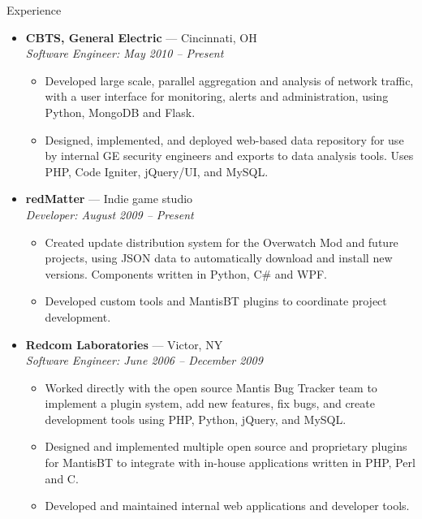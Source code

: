 \documentclass[11pt,oneside]{article}
\newenvironment{ressection}[1]{
	\vspace{8pt}
	{\fontfamily{phv}\selectfont\Large#1}
	\begin{itemize}
	\vspace{3pt}
}{
	\end{itemize}
}
\newcommand{\ressubitem}[1]{
	\vspace{-1pt}
	\item \begin{flushleft} #1 \end{flushleft}
}
\newcommand{\resbigitem}[3]{
	\vspace{-5pt}
	\item
	\textbf{#1} --- #2 \\
	\textit{#3}
}
\newenvironment{ressubsec}[3]{
	\resbigitem{#1}{#2}{#3}
	\vspace{-2pt}
	\begin{itemize}
}{
	\end{itemize}
}
\begin{document}
\begin{ressection}{Experience}

	\begin{ressubsec}{CBTS, General Electric}{Cincinnati, OH}
	{Software Engineer: May 2010 -- Present}
		\ressubitem{Developed large scale, parallel aggregation and analysis of network
		traffic, with a user interface for monitoring, alerts and administration, using Python, MongoDB and Flask.}
		\ressubitem{Designed, implemented, and deployed web-based data repository
		for use by internal GE security engineers and exports to data analysis tools.
		Uses PHP, Code Igniter, jQuery/UI, and MySQL.}
	\end{ressubsec}

	\begin{ressubsec}{redMatter}{Indie game studio}
	{Developer: August 2009 -- Present}
		\ressubitem{Created update distribution system for the Overwatch Mod and future projects, using
		JSON data to automatically download and install new versions.  Components written in Python, C\# and WPF.}
		\ressubitem{Developed custom tools and MantisBT plugins to coordinate project development.}
	\end{ressubsec}

	\begin{ressubsec}{Redcom Laboratories}{Victor, NY}
	{Software Engineer: June 2006 -- December 2009}
		\ressubitem{Worked directly with the open source Mantis Bug Tracker team to implement
		a plugin system, add new features, fix bugs, and create development tools using PHP, Python,
		jQuery, and MySQL.}
		\ressubitem{Designed and implemented multiple open source and proprietary plugins for MantisBT
		to integrate with in-house applications written in PHP, Perl and C.}
		\ressubitem{Developed and maintained internal web applications and developer tools.}
	\end{ressubsec}


\end{ressection}
\end{document}
